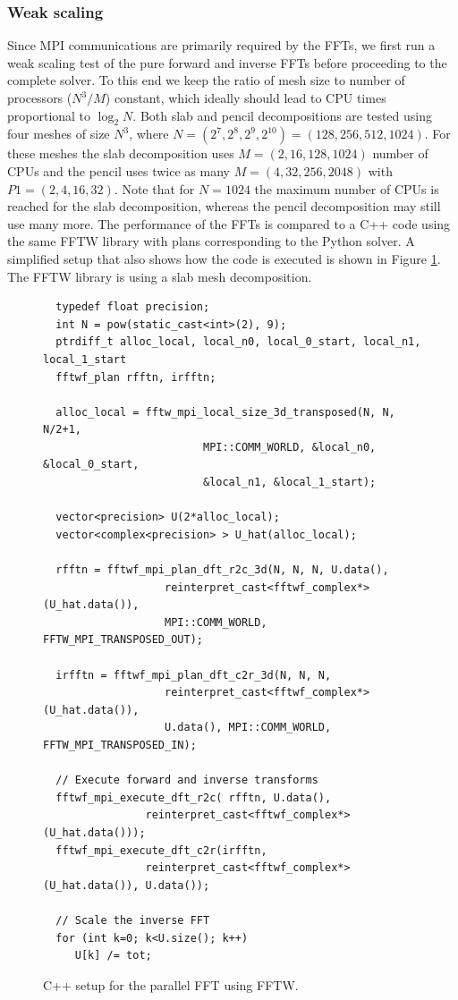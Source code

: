 \documentclass[final,3p,times,twocolumn]{elsarticle}
\begin{document}
\subsubsection{Weak scaling}
Since MPI communications are primarily required by the FFTs, we first run a 
weak scaling test of the pure forward and inverse FFTs before proceeding to the 
complete solver. To this end we keep the ratio of mesh size to number of 
processors ($N^3/M$) constant, which ideally should lead to CPU times 
proportional to $\log_2 N$. Both slab and pencil decompositions are tested 
using four meshes of size $N^3$, where $N=(2^7, 2^8, 2^9, 2^{10}) =(128, 256, 
512, 1024)$. For these meshes the slab decomposition uses 
$M=(2, 16, 128, 1024)$ number of CPUs and the pencil uses twice as many $M=(4, 
32, 256, 2048)$ with $P1=(2, 4, 16, 32)$.
Note that for $N=1024$ the maximum number of CPUs is reached for the slab decomposition, whereas the pencil
decomposition may still use many more. The performance of the FFTs is compared 
to a C++ code using the same FFTW library with plans corresponding to the 
Python solver. A simplified setup that also shows how the code is executed is 
shown in Figure \ref{fig:C++FFTW}. The FFTW library is using a slab mesh 
decomposition.

\begin{figure}[ht!]
\begin{lstlisting}
  typedef float precision;
  int N = pow(static_cast<int>(2), 9);
  ptrdiff_t alloc_local, local_n0, local_0_start, local_n1, local_1_start
  fftwf_plan rfftn, irfftn;

  alloc_local = fftw_mpi_local_size_3d_transposed(N, N, N/2+1,
                         MPI::COMM_WORLD, &local_n0, &local_0_start,
                         &local_n1, &local_1_start);

  vector<precision> U(2*alloc_local);
  vector<complex<precision> > U_hat(alloc_local);

  rfftn = fftwf_mpi_plan_dft_r2c_3d(N, N, N, U.data(),
                   reinterpret_cast<fftwf_complex*>(U_hat.data()),
                   MPI::COMM_WORLD, FFTW_MPI_TRANSPOSED_OUT);

  irfftn = fftwf_mpi_plan_dft_c2r_3d(N, N, N,
                   reinterpret_cast<fftwf_complex*>(U_hat.data()),
                   U.data(), MPI::COMM_WORLD, FFTW_MPI_TRANSPOSED_IN);

  // Execute forward and inverse transforms
  fftwf_mpi_execute_dft_r2c( rfftn, U.data(),
                reinterpret_cast<fftwf_complex*>(U_hat.data()));
  fftwf_mpi_execute_dft_c2r(irfftn,
                reinterpret_cast<fftwf_complex*>(U_hat.data()), U.data());

  // Scale the inverse FFT
  for (int k=0; k<U.size(); k++)
     U[k] /= tot;

\end{lstlisting}
\caption{C++ setup for the parallel FFT using FFTW.}
\label{fig:C++FFTW}
\end{figure}
\end{document}
